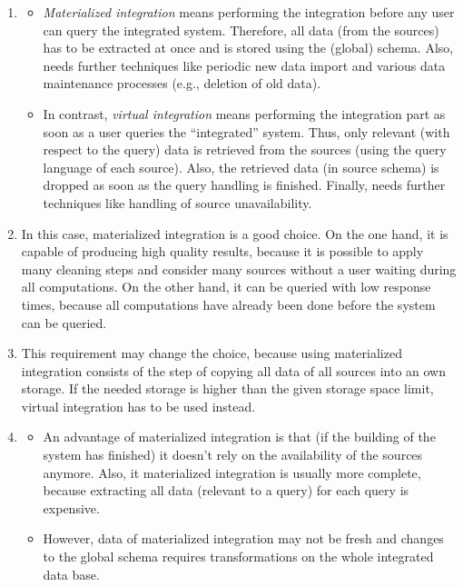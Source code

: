 \documentclass{scrartcl}
\begin{document}
	\begin{enumerate}
		\item\phantom{phantom}
		\begin{itemize}
			\item
			\textit{Materialized integration} means performing the integration before any user can query the integrated system.
			Therefore, all data (from the sources) has to be extracted at once and is stored using the (global) schema.
			Also, needs further techniques like periodic new data import and various data maintenance processes (e.g., deletion of old data).
			
			\item
			In contrast, \textit{virtual integration} means performing the integration part as soon as a user queries the \enquote{integrated} system.
			Thus, only relevant (with respect to the query) data is retrieved from the sources (using the query language of each source).
			Also, the retrieved data (in source schema) is dropped as soon as the query handling is finished.
			Finally, needs further techniques like handling of source unavailability.
		\end{itemize}
		
		\item
		In this case, materialized integration is a good choice.
		On the one hand, it is capable of producing high quality results, because it is possible to apply many cleaning steps and consider many sources without a user waiting during all computations.
		On the other hand, it can be queried with low response times, because all computations have already been done before the system can be queried.
		
		\item
		This requirement may change the choice, because using materialized integration consists of the step of copying all data of all sources into an own storage.
		If the needed storage is higher than the given storage space limit, virtual integration has to be used instead.
		\newpage
		\item\phantom{phantom}
		\begin{itemize}
			\item An advantage of materialized integration is that (if the building of the system has  finished) it doesn't rely on the availability of the sources anymore.
			Also, it materialized integration is usually more complete, because extracting all data (relevant to a query) for each query is expensive.
			
			\item However, data of materialized integration may not be fresh and changes to the global schema requires transformations on the whole integrated data base.
		\end{itemize}
	\end{enumerate}
	
\end{document}
